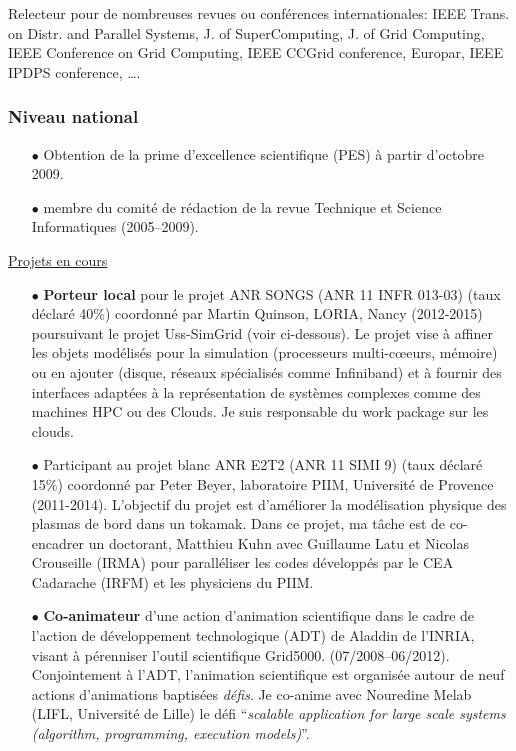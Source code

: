 \documentclass[11pt]{article}
\begin{document}
Relecteur pour de nombreuses revues ou conférences internationales: IEEE Trans. on Distr. and Parallel Systems, 
J. of SuperComputing, J. of Grid Computing, IEEE Conference on Grid Computing, IEEE CCGrid conference, Europar,
IEEE IPDPS conference, \ldots.


\subsubsection{Niveau national}
\begin{itemize}

\item[$\bullet$] Obtention de la prime d'excellence scientifique (PES) à partir d'octobre 2009.\\

\item [$\bullet$]
membre du comité de rédaction de la revue Technique et Science Informatiques (2005--2009).\\
\end{itemize}

\underline{Projets en cours}\\
\begin{itemize}


\item[$\bullet$]
\textbf{Porteur local} pour le projet ANR SONGS (ANR 11 INFR 013-03)  (taux déclaré 40\%)
coordonné par Martin Quinson, LORIA, Nancy (2012-2015)  poursuivant le projet 
Uss-SimGrid (voir ci-dessous). Le projet vise à affiner les objets modélisés pour la 
simulation (processeurs multi-c{\oe}eurs, mémoire) ou en ajouter (disque, réseaux spécialisés
comme Infiniband) et à fournir des interfaces adaptées à la représentation de systèmes
complexes comme des machines HPC ou des Clouds. Je suis responsable du work package
sur les clouds.\\

\item[$\bullet$]
Participant au projet blanc ANR E2T2 (ANR 11 SIMI 9) (taux déclaré 15\%) coordonné par 
Peter Beyer, laboratoire PIIM, Université de Provence (2011-2014). L'objectif du projet 
est d'améliorer la modélisation physique des plasmas de bord dans un tokamak. Dans ce
projet, ma tâche est de co-encadrer un doctorant, Matthieu Kuhn avec Guillaume Latu et
Nicolas Crouseille (IRMA) pour paralléliser les codes développés par le CEA Cadarache 
(IRFM) et les physiciens du PIIM. \\

\item[$\bullet$]
\textbf{Co-animateur} d'une action d'animation scientifique 
dans le cadre de l'action de développement technologique (ADT) de Aladdin de l'INRIA, 
visant à pérenniser l'outil scientifique Grid5000. (07/2008--06/2012). 
Conjointement à l'ADT, l'animation scientifique est organisée autour de neuf actions d'animations baptisées \emph{défis}.
Je co-anime avec Nouredine Melab (LIFL, Université de Lille) le défi 
``{\em scalable application for large scale systems (algorithm, programming, execution models)}''.\\
\end{itemize}
\end{document}
